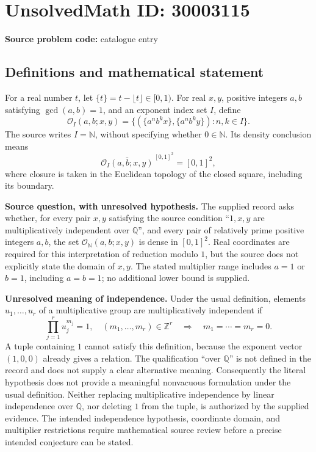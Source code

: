 \documentclass[11pt]{article}
\begin{document}
\section*{UnsolvedMath ID: 30003115}
\textbf{Source problem code:} catalogue entry
\subsection{Definitions and mathematical statement}
For a real number \(t\), let \(\{t\}=t-\lfloor t\rfloor\in[0,1)\). For real \(x,y\), positive integers \(a,b\) satisfying \(\gcd(a,b)=1\), and an exponent index set \(I\), define
\[
\mathcal O_I(a,b;x,y)=\bigl\{(\{a^n b^k x\},\{a^n b^k y\}):n,k\in I\bigr\}.
\]
The source writes \(I=\mathbb N\), without specifying whether \(0\in\mathbb N\). Its density conclusion means
\[
\overline{\mathcal O_I(a,b;x,y)}^{\,[0,1]^2}=[0,1]^2,
\]
where closure is taken in the Euclidean topology of the closed square, including its boundary.

\textbf{Source question, with unresolved hypothesis.} The supplied record asks whether, for every pair \(x,y\) satisfying the source condition ``\(1,x,y\) are multiplicatively independent over \(\mathbb Q\)'', and every pair of relatively prime positive integers \(a,b\), the set \(\mathcal O_{\mathbb N}(a,b;x,y)\) is dense in \([0,1]^2\). Real coordinates are required for this interpretation of reduction modulo \(1\), but the source does not explicitly state the domain of \(x,y\). The stated multiplier range includes \(a=1\) or \(b=1\), including \(a=b=1\); no additional lower bound is supplied.

\textbf{Unresolved meaning of independence.} Under the usual definition, elements \(u_1,\ldots,u_r\) of a multiplicative group are multiplicatively independent if
\[
\prod_{j=1}^{r}u_j^{m_j}=1,\quad (m_1,\ldots,m_r)\in\mathbb Z^r
\quad\Longrightarrow\quad m_1=\cdots=m_r=0.
\]
A tuple containing \(1\) cannot satisfy this definition, because the exponent vector \((1,0,0)\) already gives a relation. The qualification ``over \(\mathbb Q\)'' is not defined in the record and does not supply a clear alternative meaning. Consequently the literal hypothesis does not provide a meaningful nonvacuous formulation under the usual definition. Neither replacing multiplicative independence by linear independence over \(\mathbb Q\), nor deleting \(1\) from the tuple, is authorized by the supplied evidence. The intended independence hypothesis, coordinate domain, and multiplier restrictions require mathematical source review before a precise intended conjecture can be stated.
\end{document}
